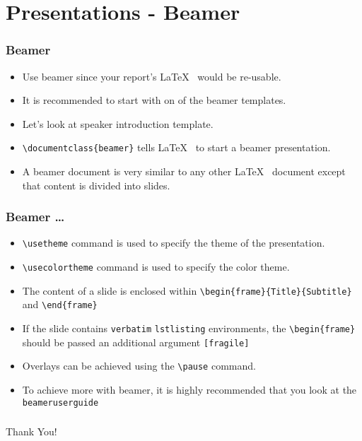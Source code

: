 \documentclass{beamer}
\begin{document}
\section{Presentations - Beamer}
\begin{frame}[fragile]
  \frametitle{Beamer}
  \begin{itemize}
  \item Use beamer since your report's \LaTeX~ would be re-usable.
  \item It is recommended to start with on of the beamer templates.
  \item Let's look at speaker introduction template.
  \item \lstinline+\documentclass{beamer}+ tells \LaTeX~ to start a
    beamer presentation. 
  \item A beamer document is very similar to any other \LaTeX~
    document except that content is divided into slides. 
  \end{itemize}
\end{frame}

\begin{frame}[fragile]
  \frametitle{Beamer \ldots}
  \begin{itemize}
  \item \lstinline+\usetheme+ command is used to specify the theme of the
    presentation. 
  \item \lstinline+\usecolortheme+ command is used to specify the color
    theme. 
  \item The content of a slide is enclosed within
    \lstinline+\begin{frame}{Title}{Subtitle}+ and
    \lstinline+\end{frame}+ 
  \item If the slide contains \lstinline+verbatim+
    \lstinline+lstlisting+ environments, the \lstinline+\begin{frame}+
    should be passed an additional argument \lstinline+[fragile]+
  \item Overlays can be achieved using the \lstinline+\pause+
    command. 
  \item To achieve more with beamer, it is highly recommended that you
    look at the \texttt{beameruserguide} 
  \end{itemize}
\end{frame}

\begin{frame}[fragile]
  \frametitle{}
  \begin{center}
    \Huge{Thank You!}
  \end{center}
\end{frame}
\end{document}
